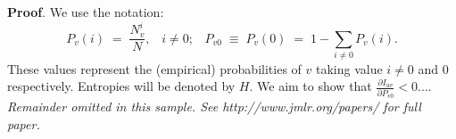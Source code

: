 \documentclass[twoside,11pt]{report}
\newcommand{\fracpartial}[2]{\frac{\partial #1}{\partial  #2}}
\begin{document}
\noindent
{\bf Proof}. We use the notation:
\[
P_v(i) \;=\;\frac{N_v^i}{N},\;\;\;i \neq 0;\;\;\;
P_{v0}\;\equiv\;P_v(0)\; = \;1 - \sum_{i\neq 0}P_v(i).
\]
These values represent the (empirical) probabilities of $v$
taking value $i\neq 0$ and 0 respectively.  Entropies will be denoted
by $H$. We aim to show that $\fracpartial{I_{uv}}{P_{v0}} < 0$....\\

{\noindent \em Remainder omitted in this sample. See http://www.jmlr.org/papers/ for full paper.}


\vskip 0.2in

% 

\end{document}
